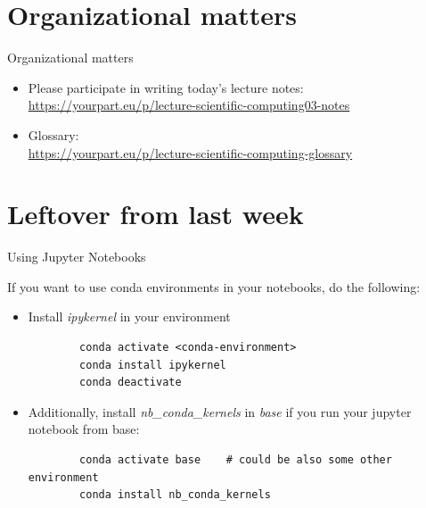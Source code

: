 
\subtitle{Start programming in Python}
\date{2020-04-02}


\begin{frame}
	\tableofcontents
\end{frame}

\section{Organizational matters}
\begin{frame}[fragile]{Organizational matters}
	\begin{itemize}
		\item Please participate in writing today's lecture notes:
            \href{https://yourpart.eu/p/lecture-scientific-computing03-notes}{https://yourpart.eu/p/lecture-scientific-computing03-notes}\pause
        \item Glossary:\\
            \href{https://yourpart.eu/p/lecture-scientific-computing-glossary}{https://yourpart.eu/p/lecture-scientific-computing-glossary}
	\end{itemize}
\end{frame}

\section{Leftover from last week}

\begin{frame}[fragile]{Using Jupyter Notebooks}

	If you want to use conda environments in your notebooks, do the following:
	\begin{itemize}
		\item Install \textit{ipykernel} in your environment

		\begin{verbatim}
		conda activate <conda-environment>
		conda install ipykernel
		conda deactivate
		\end{verbatim}
		\item Additionally, install \textit{nb\_conda\_kernels} in \textit{base} if you run your jupyter notebook from base:
		\begin{verbatim}
		conda activate base    # could be also some other environment
		conda install nb_conda_kernels
		\end{verbatim}
	\end{itemize}
\end{frame}

